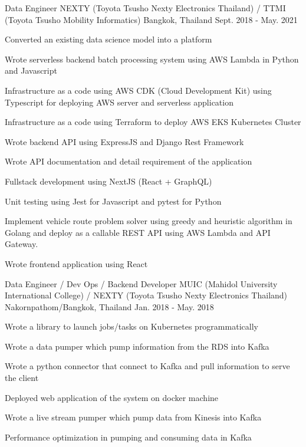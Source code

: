 \begin{cventries}
  \cventry
    {Data Engineer} %
    {NEXTY (Toyota Tsusho Nexty Electronics Thailand) / TTMI (Toyota Tsusho Mobility Informatics)} %
    {Bangkok, Thailand} %
    {Sept. 2018 - May. 2021} %
    {
      \begin{cvitems} %
        \item {Converted an existing data science model into a platform}
        \item {Wrote serverless backend batch processing system using AWS Lambda in Python and Javascript}
        \item {
          Infrastructure as a code using AWS CDK (Cloud Development Kit) using
          Typescript for deploying AWS server and serverless application
        }
        \item {
          Infrastructure as a code using Terraform to deploy AWS EKS Kubernetes Cluster 
        }
        \item {Wrote backend API using ExpressJS and Django Rest Framework}
        \item {Wrote API documentation and detail requirement of the application}
        \item {Fullstack development using NextJS (React + GraphQL)}
        \item {Unit testing using Jest for Javascript and pytest for Python}
        \item Implement vehicle route problem solver using greedy and heuristic algorithm in Golang and deploy as a callable REST API using AWS Lambda and API Gateway. 
        \item {Wrote frontend application using React}
      \end{cvitems}
    }

  \cventry
    {Data Engineer / Dev Ops / Backend Developer} %
    {MUIC (Mahidol University International College) / NEXTY (Toyota Tsusho Nexty Electronics Thailand)} %
    {Nakornpathom/Bangkok, Thailand} %
    {Jan. 2018 - May. 2018} %
    {
      \begin{cvitems} %
        \item {Wrote a library to launch jobs/tasks on Kubernetes programmatically}
        \item {Wrote a data pumper which pump information from the RDS into Kafka}
        \item {Wrote a python connector that connect to Kafka and pull information to serve the client}
        \item {Deployed web application of the system on docker machine}
        \item {Wrote a live stream pumper which pump data from Kinesis into Kafka}
        \item {Performance optimization in pumping and consuming data in Kafka}
      \end{cvitems}
    }
    

\end{cventries}
